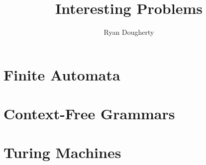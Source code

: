 \documentclass[10pt]{article}
\title{Interesting Problems}
\author{Ryan Dougherty}
\date{}
\begin{document}
\maketitle

\section{Finite Automata}

\section{Context-Free Grammars}

\section{Turing Machines}
\end{document}
